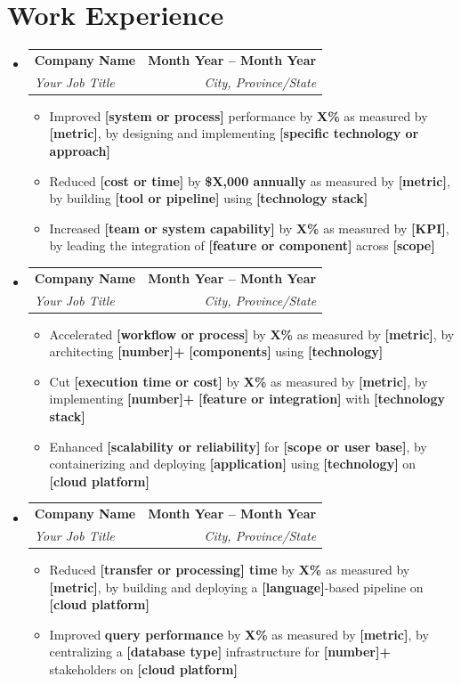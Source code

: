 \documentclass[letterpaper,11pt]{article}
\makeatletter
\newcommand{\resumeItem}[1]{
  \item\small{
    {#1 \vspace{0pt}}
  }
}
\newcommand{\resumeSubheading}[4]{
  \vspace{-2pt}\item
    \begin{tabular*}{1.0\textwidth}[t]{l@{\extracolsep{\fill}}r}
      \textbf{#1} & \textbf{\small #2} \\
      \textit{\small#3} & \textit{\small #4} \\
    \end{tabular*}\vspace{-7pt}
}
\newcommand{\resumeSubHeadingListStart}{\begin{itemize}[leftmargin=0.0in, label={}]}
\newcommand{\resumeSubHeadingListEnd}{\end{itemize}}\vspace{0pt}
\newcommand{\resumeItemListStart}{\begin{itemize}}
\newcommand{\resumeItemListEnd}{\end{itemize}\vspace{-5pt}}
\makeatother
\begin{document}
\section{Work Experience}
    \resumeSubHeadingListStart
                \resumeSubheading{Company Name}{Month Year -- Month Year}{Your Job Title}{City, Province/State}
                \resumeItemListStart
                    \resumeItem{Improved \textbf{[system or process]} performance by \textbf{X\%} as measured by \textbf{[metric]}, by designing and implementing \textbf{[specific technology or approach]}}
                    \resumeItem{Reduced \textbf{[cost or time]} by \textbf{\$X,000 annually} as measured by \textbf{[metric]}, by building \textbf{[tool or pipeline]} using \textbf{[technology stack]}}
                    \resumeItem{Increased \textbf{[team or system capability]} by \textbf{X\%} as measured by \textbf{[KPI]}, by leading the integration of \textbf{[feature or component]} across \textbf{[scope]}}
                    \resumeItemListEnd
            \resumeSubheading{Company Name}{Month Year -- Month Year}{Your Job Title}{City, Province/State}
                \resumeItemListStart
                    \resumeItem{Accelerated \textbf{[workflow or process]} by \textbf{X\%} as measured by \textbf{[metric]}, by architecting \textbf{[number]+} \textbf{[components]} using \textbf{[technology]}}
                    \resumeItem{Cut \textbf{[execution time or cost]} by \textbf{X\%} as measured by \textbf{[metric]}, by implementing \textbf{[number]+} \textbf{[feature or integration]} with \textbf{[technology stack]}}
                    \resumeItem{Enhanced \textbf{[scalability or reliability]} for \textbf{[scope or user base]}, by containerizing and deploying \textbf{[application]} using \textbf{[technology]} on \textbf{[cloud platform]}}
                    \resumeItemListEnd
            \resumeSubheading{Company Name}{Month Year -- Month Year}{Your Job Title}{City, Province/State}
                \resumeItemListStart
                    \resumeItem{Reduced \textbf{[transfer or processing] time} by \textbf{X\%} as measured by \textbf{[metric]}, by building and deploying a \textbf{[language]}-based pipeline on \textbf{[cloud platform]}}
                    \resumeItem{Improved \textbf{query performance} by \textbf{X\%} as measured by \textbf{[metric]}, by centralizing a \textbf{[database type]} infrastructure for \textbf{[number]+} stakeholders on \textbf{[cloud platform]}}
                    \resumeItemListEnd
    \resumeSubHeadingListEnd
    \vspace{-12pt}
\end{document}
